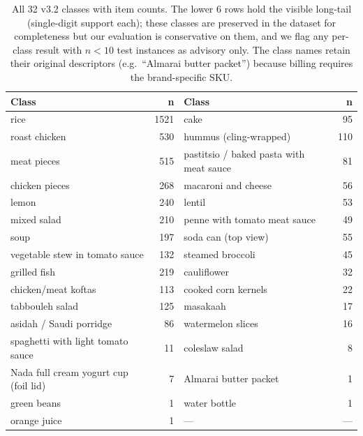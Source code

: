 \begin{table}[t]
\centering\scriptsize
\setlength{\tabcolsep}{4pt}
\begin{tabular}{lr|lr}
\toprule
\textbf{Class}                                  & \textbf{n} & \textbf{Class}                                & \textbf{n} \\
\midrule
rice                                            & 1521 & cake                                          & 95   \\
roast chicken                                   & 530  & hummus (cling-wrapped)                        & 110  \\
meat pieces                                     & 515  & pastitsio / baked pasta with meat sauce       & 81   \\
chicken pieces                                  & 268  & macaroni and cheese                           & 56   \\
lemon                                           & 240  & lentil                                        & 53   \\
mixed salad                                     & 210  & penne with tomato meat sauce                  & 49   \\
soup                                            & 197  & soda can (top view)                           & 55   \\
vegetable stew in tomato sauce                  & 132  & steamed broccoli                              & 45   \\
grilled fish                                    & 219  & cauliflower                                   & 32   \\
chicken/meat koftas                             & 113  & cooked corn kernels                           & 22   \\
tabbouleh salad                                 & 125  & masakaah                                      & 17   \\
asidah / Saudi porridge                         & 86   & watermelon slices                             & 16   \\
\midrule
spaghetti with light tomato sauce               & 11   & coleslaw salad                                & 8    \\
Nada full cream yogurt cup (foil lid)           & 7    & Almarai butter packet                         & 1    \\
green beans                                     & 1    & water bottle                                  & 1    \\
orange juice                                    & 1    & --- & --- \\
\bottomrule
\end{tabular}
\caption{All 32 v3.2 classes with item counts. The lower 6 rows hold the
visible long-tail (single-digit support each); these classes are
preserved in the dataset for completeness but our evaluation is
conservative on them, and we flag any per-class result with $n\!<\!10$
test instances as advisory only. The class names retain their original
descriptors (e.g.\ ``Almarai butter packet'') because billing requires
the brand-specific SKU.}
\label{tab:de:classes}
\end{table}

